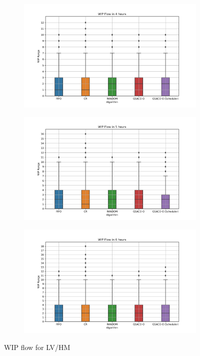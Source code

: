 \begin{figure}[t]
\begin{subfigure}{0.32\textwidth}
	\end{subfigure}
	\begin{subfigure}{0.32\textwidth}
		\includegraphics[width=\textwidth]{LVHM/new_period_14400s.png}
	\end{subfigure}\hfill
	\begin{subfigure}{0.32\textwidth}
		\includegraphics[width=\textwidth]{LVHM/new_period_18000s.png}
	\end{subfigure}\hfill
	\begin{subfigure}{0.32\textwidth}
		\includegraphics[width=\textwidth]{LVHM/new_period_21600s.png}
	\end{subfigure}
    \caption{WIP flow for LV/HM}
    \label{fig:wip-flows-LVHM}
\end{figure}

